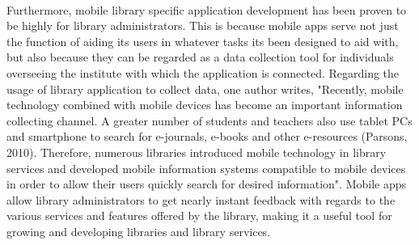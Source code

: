      \paragraph{}
     Furthermore, mobile library specific application development has been proven to be highly for library administrators. This is because mobile apps serve not just the function of aiding its users in whatever tasks its been designed to aid with, but also because they can be regarded as a data collection tool for individuals overseeing the institute with which the application is connected. Regarding the usage of library application to collect data, one author writes, "Recently, mobile technology combined with mobile devices has become an important information collecting channel. A greater number of students and teachers also use tablet PCs and smartphone to search for e-journals, e-books and other e-resources  (Parsons,  2010).  Therefore,  numerous  libraries  introduced  mobile technology in library services and developed mobile information systems compatible to mobile devices in order to allow their users quickly search for desired information"\cite{pu_chiu_chen_huang_2015}. Mobile apps allow library administrators to get nearly instant feedback with regards to the various services and features offered by the library, making it a useful tool for growing and developing libraries and library services. 
    
    
        
